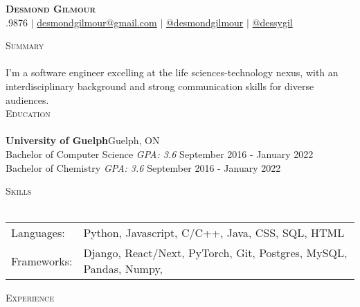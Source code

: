 \documentclass[a4paper]{article}
\newcommand{\lineunder} {
    \vspace*{-8pt} \\
    \hspace*{-18pt} \hrulefill \\
}
\newcommand{\header} [1] {
    {\hspace*{-18pt}\vspace*{6pt} \textsc{#1}}
    \vspace*{-6pt} \lineunder
}
\begin{document}
\vspace*{-40pt}

    

\vspace*{-10pt}
\begin{center}

	\textbf{{\Huge \scshape {Desmond Gilmour}}}\\
	\faPhone{}.9876 $|$ 
        \faEnvelope\space\href{mailto:desmondgilmour@gmail.com}{desmondgilmour@gmail.com} $|$  
        \faLinkedinSquare\space\href{https://www.linkedin.com/in/desmond-gilmour-886b3a128/}{@desmondgilmour} $|$
        \faGithubSquare\space\href{https://github.com/dessygil}{@dessygil}
        \\
\end{center}

\header {Summary}
I'm a software engineer excelling at the life sciences-technology nexus, with an interdisciplinary background and strong communication skills for diverse audiences.
\\

\header{Education}
\textbf{University of Guelph}\hfill Guelph, ON\\
Bachelor of Computer Science \textit{GPA: 3.6} \hfill September 2016 - January 2022\\
Bachelor of Chemistry \textit{GPA: 3.6} \hfill September 2016 - January 2022\\
\vspace{2mm}

\header{Skills}
\begin{tabular}{ l l }
	Languages:        & Python, Javascript, C/C++, Java, CSS, SQL, HTML                      \\
	Frameworks:       & Django, React/Next, PyTorch, Git, Postgres, MySQL, Pandas, Numpy,   \\
\end{tabular}
\vspace{2mm}

\header{Experience}
\vspace{1mm}
\end{document}
